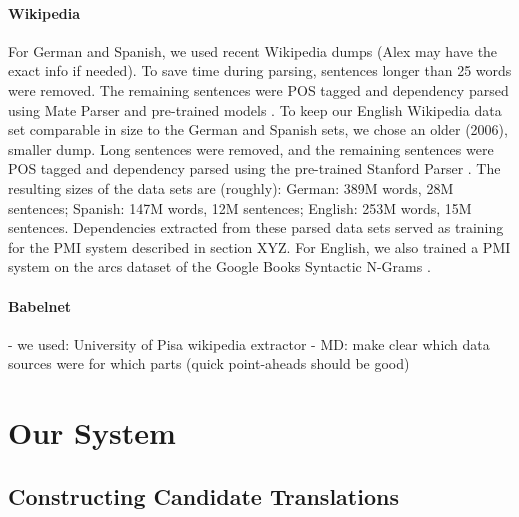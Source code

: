 \documentclass[11pt]{article}
\begin{document}
\paragraph{Wikipedia} %
For German and Spanish, we used recent Wikipedia dumps (Alex may have the exact info if needed). To save time during parsing, sentences longer than 25 words were removed. The remaining sentences were POS tagged and dependency parsed using Mate Parser and pre-trained models \cite{bohnet:10,bohnet:kuhn:12,seeker:kuhn:13}. To keep our English Wikipedia data set comparable in size to the German and Spanish sets, we chose an older (2006), smaller dump. Long sentences were removed, and the remaining sentences were POS tagged and dependency parsed using the pre-trained Stanford Parser \cite{klein:manning:03,marneffe:maccartney:ea:06}. The resulting sizes of the data sets are (roughly): German: 389M words, 28M sentences; Spanish: 147M words, 12M sentences; English: 253M words, 15M sentences. Dependencies extracted from these parsed data sets served as training for the PMI system described in section XYZ.
For English, we also trained a PMI system on the arcs dataset of the Google Books Syntactic N-Grams \cite{goldberg:orwant:13}.

\paragraph{Babelnet} %

- we used: University of Pisa wikipedia extractor
- MD: make clear which data sources were for which parts (quick point-aheads should be good)

\section{Our  System}

\subsection{Constructing Candidate Translations}
\end{document}
